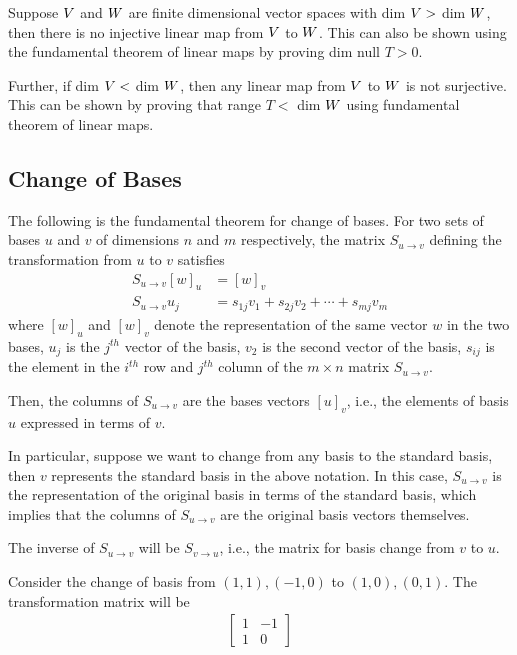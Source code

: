 \documentclass[../../linear_algebra.tex]{subfiles}
\begin{document}
Suppose $V$ and $W$ are finite dimensional vector spaces with dim $V >$ dim $W$, then there is no injective linear map from $V$ to $W$. This can also be shown using the fundamental theorem of linear maps by proving dim null $T > 0$.\newline

Further, if dim $V < $ dim $W$, then any linear map from $V$ to $W$ is not surjective. This can be shown by proving that range $T <$ dim $W$ using fundamental theorem of linear maps.

\subsection{Change of Bases}
The following is the fundamental theorem for change of bases. For two sets of bases $u$ and $v$ of dimensions $n$ and $m$ respectively, the matrix $S_{u \to v}$ defining the transformation from $u$ to $v$ satisfies
\begin{align*}
    S_{u \to v} [w]_{u} &= [w]_{v}\\
    S_{u \to v} u_{j} &= s_{1j}v_{1} + s_{2j}v_{2} + \cdots + s_{mj}v_{m}
\end{align*}
where $[w]_{u}$ and $[w]_{v}$ denote the representation of the same vector $w$ in the two bases, $u_{j}$ is the $j^{th}$ vector of the basis, $v_{2}$ is the second vector of the basis, $s_{ij}$ is the element in the $i^{th}$ row and $j^{th}$ column of the $m \times n$ matrix $S_{u \to v}$.\newline

Then, the columns of $S_{u \to v}$ are the bases vectors $[u]_{v}$, i.e., the elements of basis $u$ expressed in terms of $v$.\newline

In particular, suppose we want to change from any basis to the standard basis, then $v$ represents the standard basis in the above notation. In this case, $S_{u \to v}$ is the representation of the original basis in terms of the standard basis, which implies that the columns of $S_{u \to v}$ are the original basis vectors themselves.\newline

The inverse of $S_{u \to v}$ will be $S_{v \to u}$, i.e., the matrix for basis change from $v$ to $u$.\newline

Consider the change of basis from $(1,1), (-1,0)$ to $(1,0), (0,1)$. The transformation matrix will be
\begin{align*}
    \begin{bmatrix}
        1 &-1\\
        1 &0
    \end{bmatrix}
\end{align*}
\end{document}
